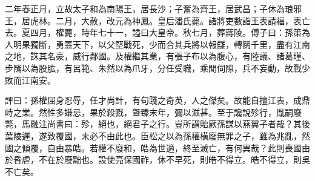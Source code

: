 \begin{pinyinscope}
二年春正月，立故太子和為南陽王，居長沙；子奮為齊王，居武昌；子休為琅邪王，居虎林。二月，大赦，改元為神鳳。皇后潘氏薨。諸將吏數詣王表請福，表亡去。夏四月，權薨，時年七十一，謚曰大皇帝。秋七月，葬蔣陵。傅子曰：孫策為人明果獨斷，勇蓋天下，以父堅戰死，少而合其兵將以報讎，轉鬬千里，盡有江南之地，誅其名豪，威行鄰國。及權繼其業，有張子布以為腹心，有陸議、諸葛瑾、步隲以為股肱，有呂範、朱然以為爪牙，分任受職，乘閒伺隙，兵不妄動，故戰少敗而江南安。

評曰：孫權屈身忍辱，任才尚計，有句踐之奇英，人之傑矣。故能自擅江表，成鼎峙之業。然性多嫌忌，果於殺戮，曁臻末年，彌以滋甚。至于讒說殄行，胤嗣廢斃，馬融注尚書曰：殄，絕也，絕君子之行。豈所謂貽厥孫謀以燕翼子者哉？其後葉陵遲，遂致覆國，未必不由此也。臣松之以為孫權橫廢無罪之子，雖為兆亂，然國之傾覆，自由暴皓。若權不廢和，皓為世適，終至滅亡，有何異哉？此則喪國由於昏虐，不在於廢黜也。設使亮保國祚，休不早死，則皓不得立。皓不得立，則吳不亡矣。


\end{pinyinscope}